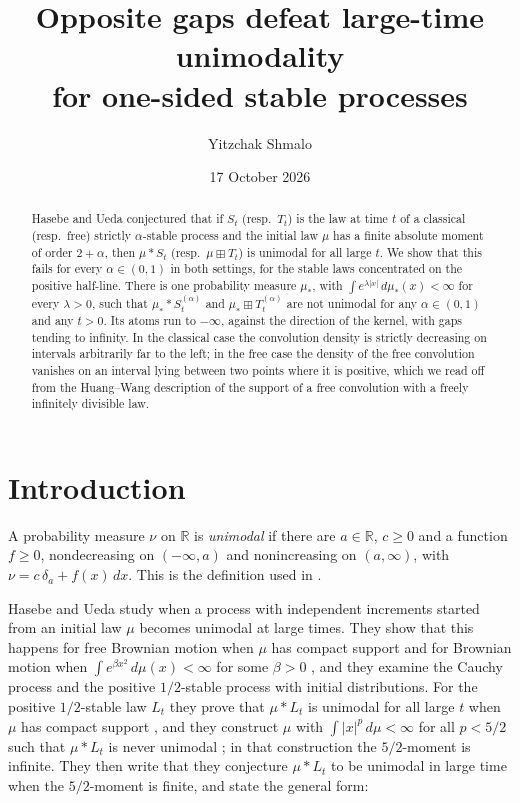 \documentclass[11pt]{amsart}
\title[Opposite gaps and large-time unimodality]{Opposite gaps defeat large-time unimodality\\ for one-sided stable processes}
\author{Yitzchak Shmalo}
\date{17 October 2026}
\theoremstyle{definition}
\theoremstyle{remark}
\numberwithin{equation}{section}
\newcommand{\R}{\mathbb R}
\newcommand{\bp}{\boxplus}
\begin{document}
\begin{abstract}
Hasebe and Ueda conjectured that if $S_t$ (resp.\ $T_t$) is the law at time $t$ of a classical (resp.\ free) strictly $\alpha$-stable process and the initial law $\mu$ has a finite absolute moment of order $2+\alpha$, then $\mu*S_t$ (resp.\ $\mu\bp T_t$) is unimodal for all large $t$. We show that this fails for every $\alpha\in(0,1)$ in both settings, for the stable laws concentrated on the positive half-line. There is one probability measure $\mu_\ast$, with $\int e^{\lambda|x|}\,d\mu_\ast(x)<\infty$ for every $\lambda>0$, such that $\mu_\ast*S^{(\alpha)}_t$ and $\mu_\ast\bp T^{(\alpha)}_t$ are not unimodal for any $\alpha\in(0,1)$ and any $t>0$. Its atoms run to $-\infty$, against the direction of the kernel, with gaps tending to infinity. In the classical case the convolution density is strictly decreasing on intervals arbitrarily far to the left; in the free case the density of the free convolution vanishes on an interval lying between two points where it is positive, which we read off from the Huang--Wang description of the support of a free convolution with a freely infinitely divisible law.
\end{abstract}
\maketitle

\section{Introduction}\label{sec:intro}

A probability measure $\nu$ on $\R$ is \emph{unimodal} if there are $a\in\R$, $c\ge0$ and a function $f\ge0$, nondecreasing on $(-\infty,a)$ and nonincreasing on $(a,\infty)$, with $\nu=c\,\delta_a+f(x)\,dx$. This is the definition used in \cite{HU}.

Hasebe and Ueda \cite{HU} study when a process with independent increments started from an initial law $\mu$ becomes unimodal at large times. They show that this happens for free Brownian motion when $\mu$ has compact support and for Brownian motion when $\int e^{\beta x^2}\,d\mu(x)<\infty$ for some $\beta>0$ \cite[Theorems 1.2 and 1.3]{HU}, and they examine the Cauchy process and the positive $1/2$-stable process with initial distributions. For the positive $1/2$-stable law $L_t$ they prove that $\mu*L_t$ is unimodal for all large $t$ when $\mu$ has compact support \cite[Theorem 5.3]{HU}, and they construct $\mu$ with $\int|x|^p\,d\mu<\infty$ for all $p<5/2$ such that $\mu*L_t$ is never unimodal \cite[Proposition 5.4]{HU}; in that construction the $5/2$-moment is infinite. They then write that they conjecture $\mu*L_t$ to be unimodal in large time when the $5/2$-moment is finite, and state the general form:
\end{document}
